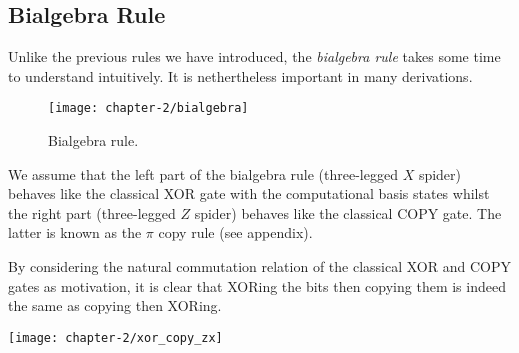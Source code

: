 
\subsection{Bialgebra Rule}
Unlike the previous rules we have introduced, the \textit{bialgebra rule} takes some time to understand intuitively. It is nethertheless important in many derivations.
\begin{figure}[H]
    \centering
    \texttt{[image: chapter-2/bialgebra]}
    \caption{Bialgebra rule.}
\end{figure}

We assume that the left part of the bialgebra rule (three-legged $X$ spider) behaves like the classical XOR gate with the computational basis states whilst the right part (three-legged $Z$ spider) behaves like the classical COPY gate. The latter is known as the $\pi$ copy rule (see appendix).

By considering the natural commutation relation of the classical XOR and COPY gates as motivation, it is clear that XORing the bits then copying them is indeed the same as copying then XORing.
\begin{center}
\texttt{[image: chapter-2/xor\_copy\_zx]}
\end{center}

